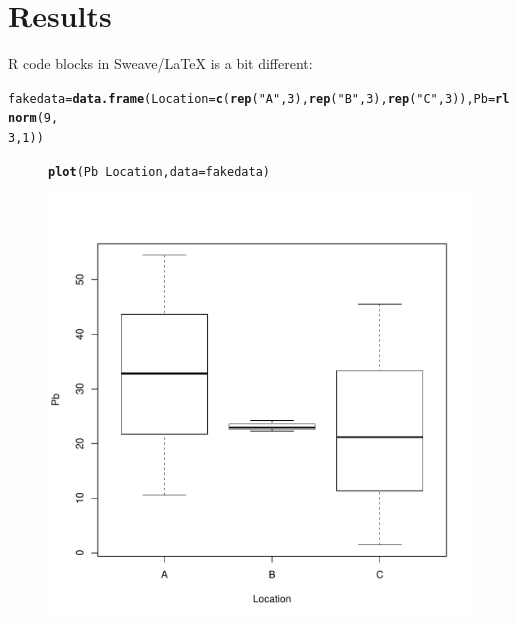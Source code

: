 \documentclass{article}\usepackage[]{graphicx}\usepackage[]{color}
\makeatletter
\def\maxwidth{ %
  \ifdim\Gin@nat@width>\linewidth
    \linewidth
  \else
    \Gin@nat@width
  \fi
}
\newcommand{\hlnum}[1]{\textcolor[rgb]{0.686,0.059,0.569}{#1}}%
\newcommand{\hlstr}[1]{\textcolor[rgb]{0.192,0.494,0.8}{#1}}%
\newcommand{\hlopt}[1]{\textcolor[rgb]{0,0,0}{#1}}%
\newcommand{\hlstd}[1]{\textcolor[rgb]{0.345,0.345,0.345}{#1}}%
\newcommand{\hlkwb}[1]{\textcolor[rgb]{0.69,0.353,0.396}{#1}}%
\newcommand{\hlkwc}[1]{\textcolor[rgb]{0.333,0.667,0.333}{#1}}%
\newcommand{\hlkwd}[1]{\textcolor[rgb]{0.737,0.353,0.396}{\textbf{#1}}}%
\newenvironment{kframe}{%
 \def\at@end@of@kframe{}%
 \ifinner\ifhmode%
  \def\at@end@of@kframe{\end{minipage}}%
  \begin{minipage}{\columnwidth}%
 \fi\fi%
 \def\FrameCommand##1{\hskip\@totalleftmargin \hskip-\fboxsep
 \colorbox{shadecolor}{##1}\hskip-\fboxsep
     \hskip-\linewidth \hskip-\@totalleftmargin \hskip\columnwidth}%
 \MakeFramed {\advance\hsize-\width
   \@totalleftmargin\z@ \linewidth\hsize
   \@setminipage}}%
 {\par\unskip\endMakeFramed%
 \at@end@of@kframe}
\newenvironment{knitrout}{}{} %
\makeatother
\begin{document}
\section{Results}

R code blocks in Sweave/LaTeX is a bit different:

\begin{knitrout}
\color{fgcolor}\begin{kframe}
\begin{alltt}
\hlstd{fakedata} \hlkwb{=} \hlkwd{data.frame}\hlstd{(}\hlkwc{Location} \hlstd{=} \hlkwd{c}\hlstd{(}\hlkwd{rep}\hlstd{(}\hlstr{"A"}\hlstd{,} \hlnum{3}\hlstd{),} \hlkwd{rep}\hlstd{(}\hlstr{"B"}\hlstd{,} \hlnum{3}\hlstd{),} \hlkwd{rep}\hlstd{(}\hlstr{"C"}\hlstd{,} \hlnum{3}\hlstd{)),} \hlkwc{Pb} \hlstd{=} \hlkwd{rlnorm}\hlstd{(}\hlnum{9}\hlstd{,}
    \hlnum{3}\hlstd{,} \hlnum{1}\hlstd{))}
\end{alltt}
\end{kframe}
\end{knitrout}

\begin{figure}
\begin{knitrout}
\color{fgcolor}\begin{kframe}
\begin{alltt}
\hlkwd{plot}\hlstd{(Pb} \hlopt{~} \hlstd{Location,} \hlkwc{data}\hlstd{=fakedata)}
\end{alltt}
\end{kframe}
\includegraphics[width=\maxwidth]{figure/boxplot-1} 

\end{knitrout}
\end{figure}
\end{document}
